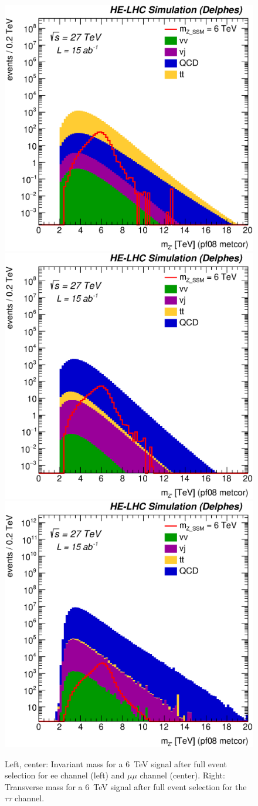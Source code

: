 \begin{figure}[h]
  \centering
  \includegraphics[width=0.30\columnwidth]{Fig/27tev/Mj1j2_pf08_MetCorr_fit_sel0_nostack_log_tt.eps}
  \includegraphics[width=0.30\columnwidth]{Fig/27tev/Mj1j2_pf08_MetCorr_fit_sel0_nostack_log_bb.eps}
  \includegraphics[width=0.30\columnwidth]{Fig/27tev/Mj1j2_pf08_MetCorr_fit_sel0_nostack_log_jj.eps}
  \caption{Left, center: Invariant mass for a 6~TeV signal after full event selection for ee channel (left) and $\mu\mu$ channel (center). Right: Transverse mass for a 6~TeV signal after full event selection for the $\tau\tau$ channel. }
  \label{figure:leptonicresonances:masses}
\end{figure}



